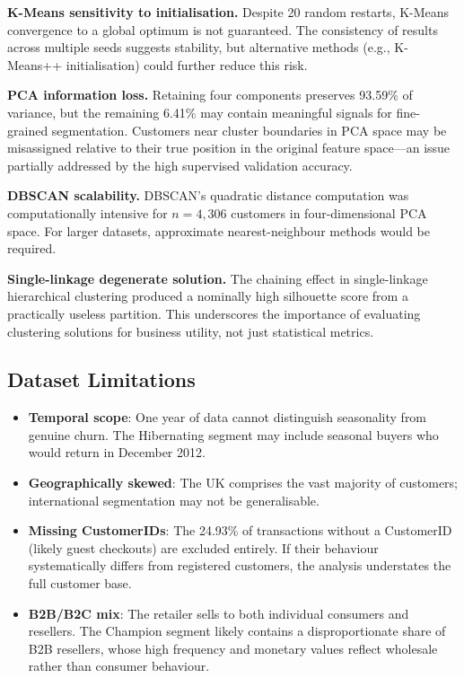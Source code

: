 \documentclass[12pt,a4paper]{article}
\begin{document}
\textbf{K-Means sensitivity to initialisation.} Despite 20 random restarts, K-Means
convergence to a global optimum is not guaranteed.  The consistency of results across
multiple seeds suggests stability, but alternative methods (e.g., K-Means++ initialisation)
could further reduce this risk.

\textbf{PCA information loss.} Retaining four components preserves 93.59\% of variance,
but the remaining 6.41\% may contain meaningful signals for fine-grained segmentation.
Customers near cluster boundaries in PCA space may be misassigned relative to their
true position in the original feature space---an issue partially addressed by the
high supervised validation accuracy.

\textbf{DBSCAN scalability.} DBSCAN's quadratic distance computation was computationally
intensive for $n=4,306$ customers in four-dimensional PCA space.  For larger datasets,
approximate nearest-neighbour methods would be required.

\textbf{Single-linkage degenerate solution.} The chaining effect in single-linkage
hierarchical clustering produced a nominally high silhouette score from a practically
useless partition.  This underscores the importance of evaluating clustering solutions
for business utility, not just statistical metrics.

\subsection{Dataset Limitations}

\begin{itemize}[leftmargin=*]
  \item \textbf{Temporal scope}: One year of data cannot distinguish seasonality from
        genuine churn.  The Hibernating segment may include seasonal buyers who would
        return in December 2012.
  \item \textbf{Geographically skewed}: The UK comprises the vast majority of customers;
        international segmentation may not be generalisable.
  \item \textbf{Missing CustomerIDs}: The 24.93\% of transactions without a CustomerID
        (likely guest checkouts) are excluded entirely.  If their behaviour systematically
        differs from registered customers, the analysis understates the full customer base.
  \item \textbf{B2B/B2C mix}: The retailer sells to both individual consumers and resellers.
        The Champion segment likely contains a disproportionate share of B2B resellers,
        whose high frequency and monetary values reflect wholesale rather than consumer behaviour.
\end{itemize}
\end{document}
